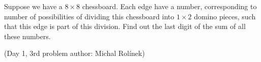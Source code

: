 Suppose we have a $8\times8$ chessboard. Each edge have a number, corresponding to number of possibilities of dividing this chessboard into $1\times2$ domino pieces, such that this edge is part of this division. Find out the last digit of the sum of all these numbers.

(Day 1, 3rd problem
author: Michal Rolínek)
